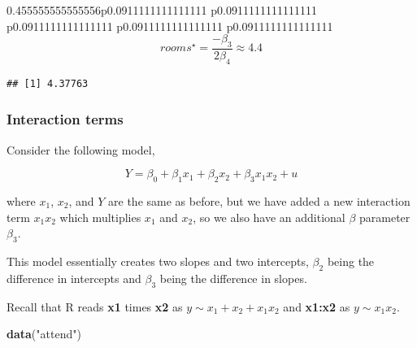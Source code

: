 \documentclass[]{book}
\newenvironment{Shaded}{\begin{snugshade}}{\end{snugshade}}
\newcommand{\DecValTok}[1]{\textcolor[rgb]{0.00,0.00,0.81}{#1}}
\newcommand{\KeywordTok}[1]{\textcolor[rgb]{0.13,0.29,0.53}{\textbf{#1}}}
\newcommand{\NormalTok}[1]{#1}
\newcommand{\OperatorTok}[1]{\textcolor[rgb]{0.81,0.36,0.00}{\textbf{#1}}}
\newcommand{\StringTok}[1]{\textcolor[rgb]{0.31,0.60,0.02}{#1}}
\begin{document}
\begin{tabularx}{0.455555555555556\textwidth}{p{} p{} p{} p{} p{}}
\begin{equation}
rooms^{\star} = \frac{-\beta_3}{2\beta_4} \approx 4.4
\end{equation}

\begin{Shaded}
\end{Shaded}

\begin{verbatim}
## [1] 4.37763
\end{verbatim}

\hypertarget{interaction-terms}{%
\subsubsection{Interaction terms}\label{interaction-terms}}

Consider the following model,

\begin{equation}
Y = {\beta}_{0} + {\beta}_{1}x_{1} +  {\beta}_{2}x_{2} + {\beta}_{3}x_{1}x_{2} + u    
\label{eq:interactionterm}
\end{equation}

where \(x_1\), \(x_2\), and \(Y\) are the same as before, but we have
added a new interaction term \(x_1x_2\) which multiplies \(x_1\) and
\(x_2\), so we also have an additional \(\beta\) parameter \(\beta_3\).

This model essentially creates two slopes and two intercepts,
\(\beta_2\) being the difference in intercepts and \(\beta_3\) being the
difference in slopes.

Recall that R reads \textbf{x1} times \textbf{x2} as
\(y \sim x_1+x_2+x_1x_2\) and \textbf{x1:x2} as \(y \sim x_1x_2\).

\begin{Shaded}
\begin{Highlighting}[]
\KeywordTok{data}\NormalTok{(}\StringTok{"attend"}\NormalTok{)}
\end{Highlighting}
\end{Shaded}


\end{tabularx}
\end{document}
